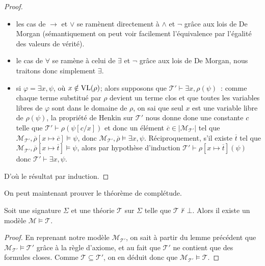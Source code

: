 \begin{proof}
\begin{itemize}
  \item les cas de $\to$ et $\lor$ se ramènent directement à $\land$ et $\lnot$
    grâce aux lois de De Morgan (sémantiquement on peut voir facilement
    l'équivalence par l'égalité des valeurs de vérité).
  \item le cas de $\forall$ se ramène à celui de $\exists$ et $\lnot$ grâce
    aux lois de De Morgan, nous traitons donc simplement $\exists$.
  \item si $\varphi = \exists x, \psi$, où $x \notin \operatorname{VL}(\rho)$; alors supposons
    que $\mathcal T'\vdash \exists x, \rho(\psi)$~: comme chaque terme substitué
    par $\rho$ devient un terme clos et que toutes les variables libres de
    $\varphi$ sont dans le domaine de $\rho$, on sai que seul $x$ est une
    variable libre de $\rho(\psi)$, la propriété de Henkin sur $\mathcal T'$
    nous donne done une constante $c$ telle que
    $\mathcal T'\vdash \rho(\psi[c/x])$
    et donc un élément $\overline c \in |\mathcal M_{\mathcal T'}|$ tel que
    $\mathcal M_{\mathcal T'}, \overline\rho[x\mapsto \overline c]
    \models \psi$,
    donc
    $\mathcal M_{\mathcal T'},\overline\rho\models \exists x, \psi$.
    Réciproquement, s'il existe $\overline t$ tel que
    $\mathcal M_{\mathcal T'},\overline\rho[x\mapsto \overline t]\models \psi$,
    alors par hypothèse d'induction
    $\mathcal T'\vdash \rho[x\mapsto \overline t](\psi)$ donc
    $\mathcal T'\vdash \exists x, \psi$.
  \end{itemize}

  D'où le résultat par induction.
\end{proof}

On peut maintenant prouver le théorème de complétude.

\begin{theorem}
  Soit une signature $\Sigma$ et une théorie $\mathcal T$ sur $\Sigma$ telle que
  $\mathcal T\nvdash\bot$. Alors il existe un modèle
  $\mathcal M\models \mathcal T$.
\end{theorem}

\begin{proof}
  En reprenant notre modèle $\mathcal M_{\mathcal T'}$, on sait à partir du lemme
  précédent que $\mathcal M_{\mathcal T'}\models \mathcal T'$ grâce à la règle
  d'axiome, et au fait que $\mathcal T'$ ne contient que des formules closes.
  Comme $\mathcal T\subseteq\mathcal T'$, on en déduit donc que
  $\mathcal M_{\mathcal T'}\models \mathcal T$.
\end{proof}

